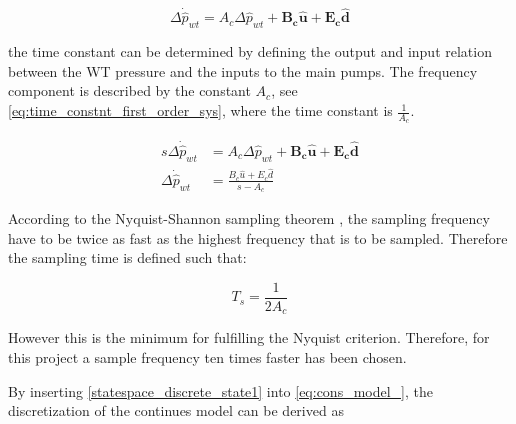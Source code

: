 \begin{equation}
\Delta \dot{\hat{p}}_{wt} = A_c \Delta \hat{p}_{wt}  + \bm{B_c} \bm{\hat{u}} + \bm{E_c} \bm{\hat{d}} 
\label{eq:cons_model_}
\end{equation}

the time constant can be determined by defining the output and input relation between the WT pressure and the inputs to the main pumps. The frequency component is described by the constant $A_c$, see \eqref{eq:time_constnt_first_order_sys}, where the time constant is $\frac{1}{A_c}$.

\begin{equation}
  \begin{split}
  s\Delta \dot{\hat{p}}_{wt} &= A_c \Delta \hat{p}_{wt}  + \bm{B_c} \bm{\hat{u}} + \bm{E_c} \bm{\hat{d}} \\
  \Delta \dot{\hat{p}}_{wt} &= \frac{B_c\hat{u}+E_c\hat{d}}{s-A_c}
  \end{split}
  \label{eq:time_constnt_first_order_sys}
\end{equation}

According to the Nyquist-Shannon sampling theorem \citep{franklin1994feedback},
the sampling frequency have to be twice as fast as the highest frequency that is to be sampled. Therefore the sampling time is defined such that:

\begin{equation}
T_s = \frac{1}{2A_c}
 \label{sampling}
\end{equation}

However this is the minimum for fulfilling the Nyquist criterion. Therefore, for this project a sample frequency ten times faster has been chosen.



By inserting \eqref{statespace_discrete_state1} into \eqref{eq:cons_model_}, the discretization of the continues model can be derived as

